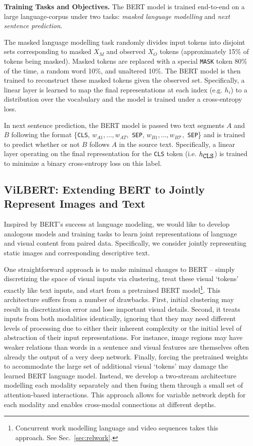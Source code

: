 \textbf{Training Tasks and Objectives.} The BERT model is trained end-to-end on a large language-corpus under two tasks: \emph{masked language modelling} and \emph{next sentence prediction}. 

The masked language modelling task randomly divides input tokens into disjoint sets corresponding to masked $X_M$ and observed $X_O$ tokens (approximately 15\% of tokens being masked). Masked tokens are replaced with a special \texttt{MASK} token 80\% of the time, a random word 10\%, and unaltered 10\%. The BERT model is then trained to reconstruct these masked tokens given the observed set. Specifically, a linear layer is learned to map the final representations at each index (e.g. $h_i$) to a distribution over the vocabulary and the model is trained under a cross-entropy loss. 

In next sentence prediction, the BERT model is passed two text segments $A$ and $B$ following the format \{\texttt{CLS}, $w_{A1}, \dots, w_{AT},$ \texttt{SEP}, $w_{B1}, \dots, w_{B\mathcal{T}},$ \texttt{SEP}\} and is trained to predict whether or not $B$ follows $A$ in the source text. Specifically, a linear layer operating on the final representation for the \texttt{CLS} token (i.e. $h_{\mbox{\texttt{CLS}}}$) is trained to minimize a binary cross-entropy loss on this label.

\subsection{ViLBERT: Extending BERT to Jointly Represent Images and Text}
\label{sec:vlbert}

Inspired by BERT's success at language modeling, we would like to develop analogous models and training tasks to learn joint representations of language and visual content from paired data. Specifically, we consider jointly representing static images and corresponding descriptive text.

One straightforward approach is to make minimal changes to BERT -- simply discretizing the space of visual inputs via clustering, treat these visual `tokens' exactly like text inputs, and start from a pretrained BERT model\footnote{Concurrent work \cite{sun2019videobert} modelling language and video sequences takes this approach. See Sec.~\ref{sec:relwork}.}. This architecture suffers from a number of drawbacks. First, initial clustering may result in discretization error and lose important visual details. Second, it treats inputs from both modalities identically, ignoring that they may need different levels of processing due to either their inherent complexity or the initial level of abstraction of their input representations.  For instance, image regions may have weaker relations than words in a sentence and visual features are themselves often already the output of a very deep network. Finally, forcing the pretrained weights to accommodate the large set of additional visual `tokens' may damage the learned BERT language model. Instead, we develop a two-stream architecture modelling each modality separately and then fusing them through a small set of attention-based interactions. This approach allows for variable network depth for each modality and enables cross-modal connections at different depths.

